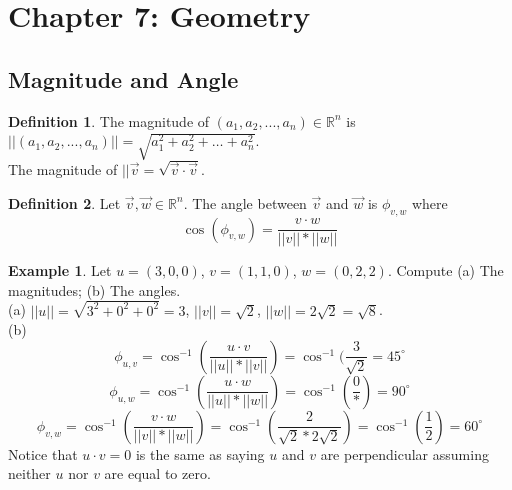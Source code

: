 \documentclass{report}
\theoremstyle{plain}
\theoremstyle{definition}
\newtheorem*{ex}{Example}
\newtheorem*{defn}{Definition}
\theoremstyle{plain}
\begin{document}
\section{Chapter 7: Geometry}
\subsection{Magnitude and Angle}
\begin{defn}
The magnitude of $(a_1,a_2,...,a_n)\in \mathbb{R}^n$ is $||(a_1,a_2,...,a_n)||=\sqrt{a_1^2+a_2^2+\dots +a_n^2}$.\\
The magnitude of $||\vec{v} = \sqrt{\vec{v}\cdot \vec{v}}$.
\end{defn}
\begin{defn}
Let $\vec{v},\vec{w}\in\mathbb{R}^n$. The angle between $\vec{v}$ and $\vec{w}$ is $\phi_{v,w}$ where
\[ \cos(\phi_{v,w})=\frac{v \cdot w}{||v|| * ||w||} \]
\end{defn}
\begin{ex}
Let $u=(3,0,0)$, $v=(1,1,0)$, $w=(0,2,2)$. Compute (a) The magnitudes; (b) The angles.\\
(a) $||u||=\sqrt{3^2+0^2+0^2} = 3$, $||v|| = \sqrt{2}$, $||w|| = 2\sqrt{2} = \sqrt{8}$.\\
(b) 
\[ \phi_{u,v}=\cos^{-1}(\frac{u\cdot v}{||u||*||v||}) = \cos^{-1}(\frac{3}{\sqrt{2}} = 45^\circ \]
\[ \phi_{u,w}= \cos^{-1}(\frac{u\cdot w}{||u||*||w||}) = \cos^{-1}(\frac{0}{*}) = 90^\circ \]
\[ \phi_{v,w} = \cos^{-1}(\frac{v\cdot w}{||v||*||w||}) = \cos^{-1}(\frac{2}{\sqrt{2}*2\sqrt{2}})=\cos^{-1}(\frac{1}{2})=60^\circ \]
Notice that $u \cdot v = 0$ is the same as saying $u$ and $v$ are perpendicular assuming neither $u$ nor $v$ are equal to zero.
\end{ex}
\end{document}
